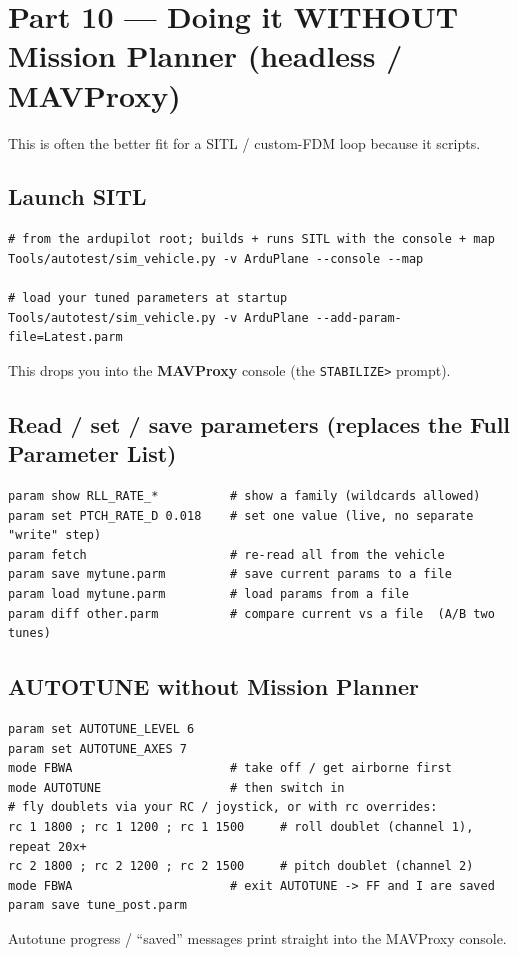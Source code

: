 \documentclass[11pt,a4paper]{article}
\newcommand{\pp}[1]{\texttt{#1}} %
\begin{document}
\section{Part 10 --- Doing it WITHOUT Mission Planner (headless / MAVProxy)}

This is often the better fit for a SITL / custom-FDM loop because it scripts.

\subsection{Launch SITL}
\begin{lstlisting}
# from the ardupilot root; builds + runs SITL with the console + map
Tools/autotest/sim_vehicle.py -v ArduPlane --console --map

# load your tuned parameters at startup
Tools/autotest/sim_vehicle.py -v ArduPlane --add-param-file=Latest.parm
\end{lstlisting}
This drops you into the \textbf{MAVProxy} console (the \pp{STABILIZE>} prompt).

\subsection{Read / set / save parameters (replaces the Full Parameter List)}
\begin{lstlisting}
param show RLL_RATE_*          # show a family (wildcards allowed)
param set PTCH_RATE_D 0.018    # set one value (live, no separate "write" step)
param fetch                    # re-read all from the vehicle
param save mytune.parm         # save current params to a file
param load mytune.parm         # load params from a file
param diff other.parm          # compare current vs a file  (A/B two tunes)
\end{lstlisting}

\subsection{AUTOTUNE without Mission Planner}
\begin{lstlisting}
param set AUTOTUNE_LEVEL 6
param set AUTOTUNE_AXES 7
mode FBWA                      # take off / get airborne first
mode AUTOTUNE                  # then switch in
# fly doublets via your RC / joystick, or with rc overrides:
rc 1 1800 ; rc 1 1200 ; rc 1 1500     # roll doublet (channel 1), repeat 20x+
rc 2 1800 ; rc 2 1200 ; rc 2 1500     # pitch doublet (channel 2)
mode FBWA                      # exit AUTOTUNE -> FF and I are saved
param save tune_post.parm
\end{lstlisting}
Autotune progress / ``saved'' messages print straight into the MAVProxy console.
\end{document}
